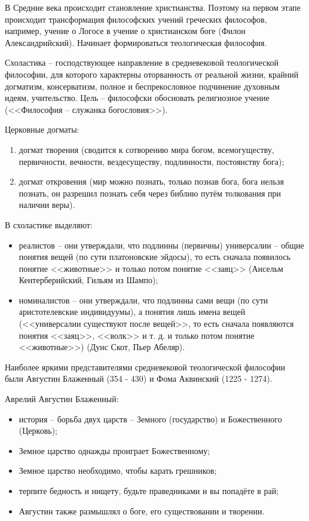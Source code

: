 
В Средние века происходит становление христианства. Поэтому на первом этапе происходит трансформация философских учений греческих философов, например, учение о Логосе в учение о христианском боге (Филон Александрийский). Начинает формироваться теологическая философия.

Схоластика -- господствующее направление в средневековой теологической философии, для которого характерны оторванность от реальной жизни, крайний догматизм, консерватизм, полное и беспрекословное подчинение духовным идеям, учительство. Цель -- философски обосновать религиозное учение (<<Философия -- служанка богословия>>).

Церковные догматы:
\begin{enumerate}
	\item догмат творения (сводится к сотворению мира богом, всемогуществу, первичности, вечности, вездесуществу, подлинности, постоянству бога);
	\item догмат откровения (мир можно познать, только познав бога, бога нельзя познать, он разрешил познать себя через библию путём толкования при наличии веры).
\end{enumerate}

В схоластике выделяют:
\begin{itemize}
	\item реалистов -- они утверждали, что подлинны (первичны) универсалии -- общие понятия вещей (по сути платоновские эйдосы), то есть сначала появилось понятие <<животные>> и только потом понятие <<заяц>> (Ансельм Кентерберийский, Гильям из Шампо);
	\item номиналистов -- они утверждали, что подлинны сами вещи (по сути аристотелевские индивидуумы), а понятия лишь имена вещей (<<универсалии существуют после вещей>>, то есть сначала появляются понятия <<заяц>>, <<волк>> и т. д. и только потом понятие <<животные>>) (Дунс Скот, Пьер Абеляр).
\end{itemize}

Наиболее яркими представителями средневековой теологической философии были Августин Блаженный (354 - 430) и Фома Аквинский (1225 - 1274).

Аврелий Августин Блаженный:
\begin{itemize}
	\item история -- борьба двух царств -- Земного (государство) и Божественного (Церковь);
	\item Земное царство однажды проиграет Божественному;
	\item Земное царство необходимо, чтобы карать грешников;
	\item терпите бедность и нищету, будьте праведниками и вы попадёте в рай;
	\item Августин также размышлял о боге, его существовании и творении.
\end{itemize}

